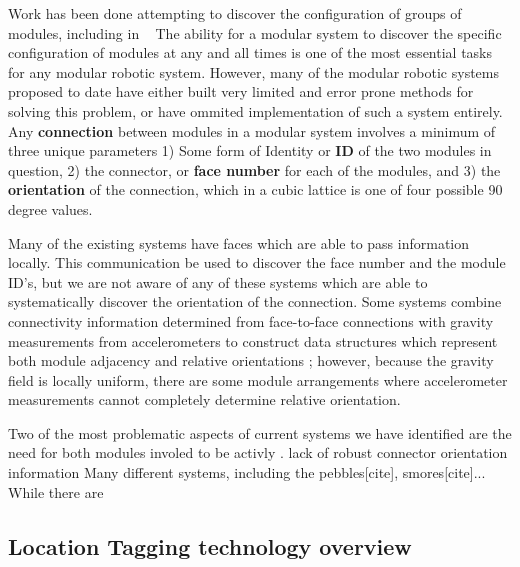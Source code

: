 	Work has been done attempting to discover the configuration of groups of modules, including in ~\cite{park2008automatic}
	The ability for a modular system to discover the specific configuration of modules at any and all times is one of the most essential tasks for any modular robotic system. However, many of the modular robotic systems proposed to date have either built very limited and error prone methods for solving this problem, or have ommited implementation of such a system entirely. Any \textbf{connection} between modules in a modular system involves a minimum of three unique parameters 1) Some form of Identity or \textbf{ID} of the two modules in question, 2) the connector, or \textbf{face number} for each of the modules, and 3) the \textbf{orientation} of the connection, which in a cubic lattice is one of four possible 90 degree values.

	Many of the existing systems have faces which are able to pass information locally. This communication be used to discover the face number and the module ID's, but we are not aware of any of these systems which are able to systematically discover the orientation of the connection. Some systems combine connectivity information determined from face-to-face connections with gravity measurements from accelerometers to construct data structures which represent both module adjacency and relative orientations \cite{Soldercubes2016}; however, because the gravity field is locally uniform, there are some module arrangements where accelerometer measurements cannot completely determine relative orientation.

	Two of the most problematic aspects of current systems we have identified are the need for both modules involed to be activly . lack of robust connector orientation information
	Many different systems, including the pebbles[cite], smores[cite]... While there are


\subsection{Location Tagging technology overview}
\label{sec:RWtaggingTech}

